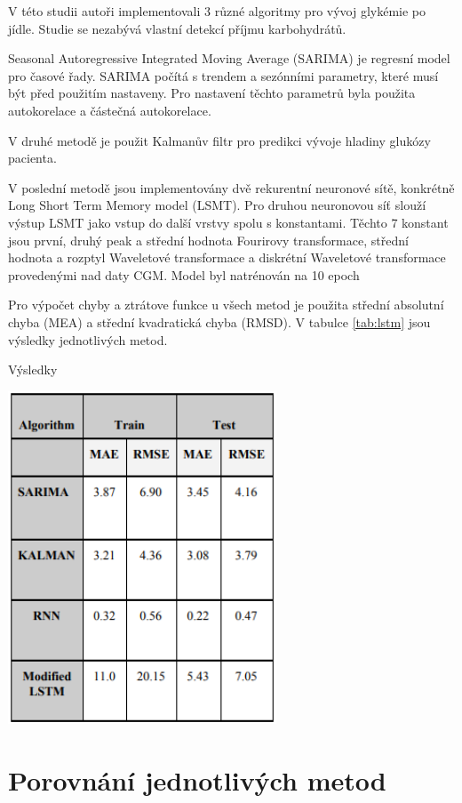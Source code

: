 V této studii autoři implementovali 3 různé algoritmy pro vývoj glykémie po jídle. Studie se nezabývá vlastní detekcí příjmu karbohydrátů.

Seasonal Autoregressive Integrated Moving Average (SARIMA) je regresní model pro časové řady. SARIMA počítá s trendem a sezónními parametry, které musí být před použitím nastaveny. Pro nastavení těchto parametrů byla použita autokorelace a částečná autokorelace.

V druhé metodě je použit Kalmanův filtr pro predikci vývoje hladiny glukózy pacienta.

V poslední metodě jsou implementovány dvě rekurentní neuronové sítě, konkrétně Long Short Term Memory model (LSMT). Pro druhou neuronovou síť slouží výstup LSMT jako vstup do další vrstvy spolu s konstantami. Těchto 7 konstant jsou první, druhý peak a střední hodnota Fourirovy transformace, střední hodnota a rozptyl Waveletové transformace a diskrétní Waveletové transformace provedenými nad daty CGM. Model byl natrénován na 10 epoch

Pro výpočet chyby a ztrátove funkce u všech metod je použita střední absolutní chyba (MEA) a střední kvadratická chyba (RMSD). V tabulce \ref{tab:lstm} jsou výsledky jednotlivých metod.

\begin{table}[H]
\caption{Výsledky}
\label{tab:lstm}
\centering
\includegraphics[width=0.6\textwidth]{img/analyza/lstm.png}
\end{table}


\section{Porovnání jednotlivých metod}

